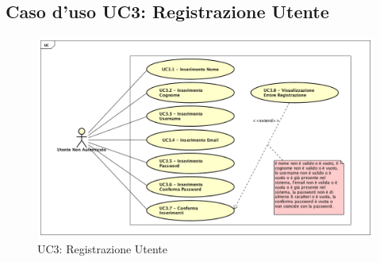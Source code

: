 \newpage
\subsection{Caso d'uso UC3:  Registrazione Utente }
\label{UC3}
\begin{figure}[ht]
	\centering
	\includegraphics[scale=0.45]{UML/UC3.png}
	\caption{UC3: Registrazione Utente}
\end{figure}

